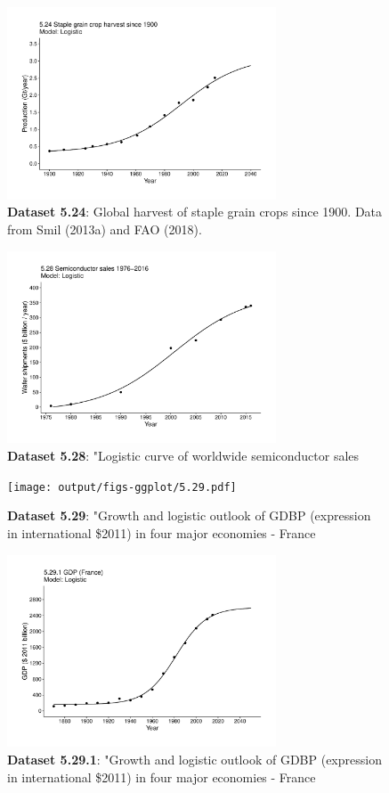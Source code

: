 \documentclass[aps,rmp,preprint,superscriptaddress,10pt,onecolumn]{article}
\begin{document}
\begin{figure}[h]
\includegraphics[width=8cm]{output/figs-ggplot/5.24.pdf}
\caption{\textbf{Dataset 5.24}: Global harvest of staple grain crops since 1900. Data from Smil (2013a) and FAO (2018).}
\end{figure}
	
\begin{figure}[h]
\includegraphics[width=8cm]{output/figs-ggplot/5.28.pdf}
\caption{\textbf{Dataset 5.28}: "Logistic curve of worldwide semiconductor sales}
\end{figure}
	
\begin{figure}[h]
\texttt{[image: output/figs-ggplot/5.29.pdf]}
\caption{\textbf{Dataset 5.29}: "Growth and logistic outlook of GDBP (expression in international \$2011) in four major economies - France}
\end{figure}
	
\begin{figure}[h]
\includegraphics[width=8cm]{output/figs-ggplot/5.29.1.pdf}
\caption{\textbf{Dataset 5.29.1}: "Growth and logistic outlook of GDBP (expression in international \$2011) in four major economies - France}
\end{figure}
	
\end{document}
